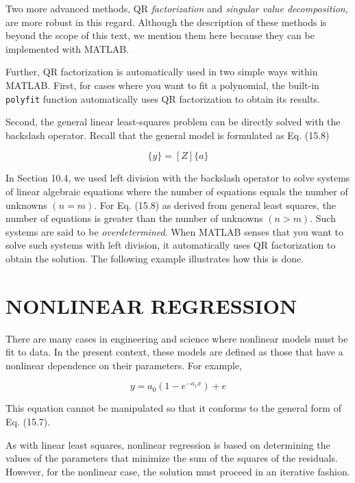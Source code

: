 \documentclass[../main.tex]{subfiles}
\begin{document}
Two more advanced methods, QR \textit{factorization} and \textit{singular value decomposition}, are
more robust in this regard. Although the description of these methods is beyond the scope
of this text, we mention them here because they can be implemented with MATLAB.

Further, QR factorization is automatically used in two simple ways within MATLAB.
First, for cases where you want to fit a polynomial, the built-in \texttt{polyfit} function automatically uses QR factorization to obtain its results.

Second, the general linear least-squares problem can be directly solved with the backslash operator. Recall that the general model is formulated as Eq. (15.8)

\begin{equation}
	\tag{15.11}
	\{y\} = [Z] \{a\}
\end{equation}

In Section 10.4, we used left division with the backslash operator to solve systems of linear algebraic equations where the number of equations equals the number of unknowns $(n = m)$.
For Eq. (15.8) as derived from general least squares, the number of equations is greater than
the number of unknowns $(n > m)$. Such systems are said to be \textit{overdetermined}. When
MATLAB senses that you want to solve such systems with left division, it automatically uses
QR factorization to obtain the solution. The following example illustrates how this is done.


\bigskip
\label{cha:cha_P_15_5} %
\section{NONLINEAR REGRESSION}

\noindent There are many cases in engineering and science where nonlinear models must be fit to
data. In the present context, these models are defined as those that have a nonlinear dependence on their parameters. For example,

\begin{equation}
	\tag{15.12}
	y = a_0 (1 - e^{-a_1 x}) + e
\end{equation}

\noindent This equation cannot be manipulated so that it conforms to the general form of Eq. (15.7).

As with linear least squares, nonlinear regression is based on determining the values
of the parameters that minimize the sum of the squares of the residuals. However, for the
nonlinear case, the solution must proceed in an iterative fashion.
\end{document}
